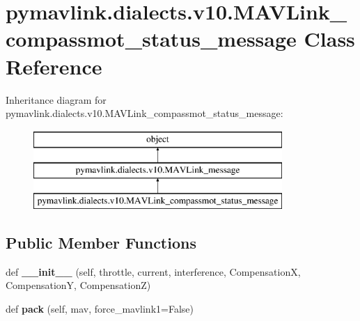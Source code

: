 \hypertarget{classpymavlink_1_1dialects_1_1v10_1_1MAVLink__compassmot__status__message}{}\section{pymavlink.\+dialects.\+v10.\+M\+A\+V\+Link\+\_\+compassmot\+\_\+status\+\_\+message Class Reference}
\label{classpymavlink_1_1dialects_1_1v10_1_1MAVLink__compassmot__status__message}
Inheritance diagram for pymavlink.\+dialects.\+v10.\+M\+A\+V\+Link\+\_\+compassmot\+\_\+status\+\_\+message\+:\begin{figure}[H]
\begin{center}
\leavevmode
\includegraphics[height=3.000000cm]{classpymavlink_1_1dialects_1_1v10_1_1MAVLink__compassmot__status__message}
\end{center}
\end{figure}
\subsection*{Public Member Functions}
\begin{DoxyCompactItemize}
\item 
\mbox{\label{classpymavlink_1_1dialects_1_1v10_1_1MAVLink__compassmot__status__message_a57ab5cc42919f5d03e4e384c4e60f8b9}} 
def {\bfseries \+\_\+\+\_\+init\+\_\+\+\_\+} (self, throttle, current, interference, CompensationX, CompensationY, CompensationZ)
\item 
\mbox{\label{classpymavlink_1_1dialects_1_1v10_1_1MAVLink__compassmot__status__message_a8bcf85a6c146915678f7093cb5597d5b}} 
def {\bfseries pack} (self, mav, force\+\_\+mavlink1=False)
\end{DoxyCompactItemize}
